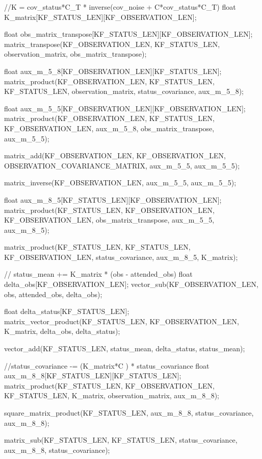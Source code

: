 \begin{ccode}
	//K = cov_status*C_T * inverse(cov_noise + C*cov_status*C_T)
	float K_matrix[KF_STATUS_LEN][KF_OBSERVATION_LEN];
	
	float obs_matrix_transpose[KF_STATUS_LEN][KF_OBSERVATION_LEN];
	matrix_transpose(KF_OBSERVATION_LEN, KF_STATUS_LEN, observation_matrix, obs_matrix_transpose);	
	
	float aux_m_5_8[KF_OBSERVATION_LEN][KF_STATUS_LEN];
	matrix_product(KF_OBSERVATION_LEN, KF_STATUS_LEN, KF_STATUS_LEN, observation_matrix, status_covariance, aux_m_5_8);
	
	float aux_m_5_5[KF_OBSERVATION_LEN][KF_OBSERVATION_LEN];
	matrix_product(KF_OBSERVATION_LEN, KF_STATUS_LEN, KF_OBSERVATION_LEN, aux_m_5_8, obs_matrix_transpose, aux_m_5_5);
	
	matrix_add(KF_OBSERVATION_LEN, KF_OBSERVATION_LEN, OBSERVATION_COVARIANCE_MATRIX, aux_m_5_5, aux_m_5_5);
	
	matrix_inverse(KF_OBSERVATION_LEN, aux_m_5_5, aux_m_5_5);
	
	float aux_m_8_5[KF_STATUS_LEN][KF_OBSERVATION_LEN];
	matrix_product(KF_STATUS_LEN, KF_OBSERVATION_LEN, KF_OBSERVATION_LEN, obs_matrix_transpose, aux_m_5_5, aux_m_8_5);
	
	matrix_product(KF_STATUS_LEN, KF_STATUS_LEN, KF_OBSERVATION_LEN, status_covariance, aux_m_8_5, K_matrix);
	
	// status_mean += K_matrix * (obs - attended_obs)
	float delta_obs[KF_OBSERVATION_LEN];
	vector_sub(KF_OBSERVATION_LEN, obs, attended_obs, delta_obs);
	
	float delta_status[KF_STATUS_LEN];
	matrix_vector_product(KF_STATUS_LEN, KF_OBSERVATION_LEN, K_matrix, delta_obs, delta_status);
	
	vector_add(KF_STATUS_LEN, status_mean, delta_status, status_mean);
	
	//status_covariance -= (K_matrix*C ) * status_covariance
	float aux_m_8_8[KF_STATUS_LEN][KF_STATUS_LEN];
	matrix_product(KF_STATUS_LEN, KF_OBSERVATION_LEN, KF_STATUS_LEN, K_matrix, observation_matrix, aux_m_8_8);

	square_matrix_product(KF_STATUS_LEN, aux_m_8_8, status_covariance, aux_m_8_8);

	matrix_sub(KF_STATUS_LEN, KF_STATUS_LEN, status_covariance, aux_m_8_8, status_covariance);
\end{ccode}
